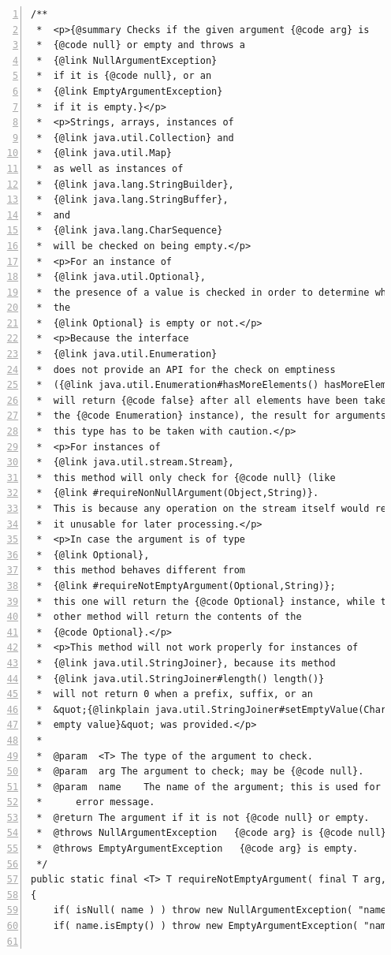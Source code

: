 \documentclass[11pt,a4paper, titlepage, parskip=half, headsepline, footsepline, cleardoublepage=current, headheight=1cm]{scrbook}
\begin{document}
\begin{lstlisting}[numbers=left,caption={requireNotEmptyArgument()},label={listing:requireNotEmptyArgument}]
/**
 *  <p>{@summary Checks if the given argument {@code arg} is 
 *  {@code null} or empty and throws a
 *  {@link NullArgumentException}
 *  if it is {@code null}, or an
 *  {@link EmptyArgumentException}
 *  if it is empty.}</p>
 *  <p>Strings, arrays, instances of
 *  {@link java.util.Collection} and
 *  {@link java.util.Map}
 *  as well as instances of
 *  {@link java.lang.StringBuilder},
 *  {@link java.lang.StringBuffer},
 *  and
 *  {@link java.lang.CharSequence}
 *  will be checked on being empty.</p>
 *  <p>For an instance of
 *  {@link java.util.Optional},
 *  the presence of a value is checked in order to determine whether
 *  the
 *  {@link Optional} is empty or not.</p>
 *  <p>Because the interface
 *  {@link java.util.Enumeration}
 *  does not provide an API for the check on emptiness
 *  ({@link java.util.Enumeration#hasMoreElements() hasMoreElements()}
 *  will return {@code false} after all elements have been taken from
 *  the {@code Enumeration} instance), the result for arguments of
 *  this type has to be taken with caution.</p>
 *  <p>For instances of
 *  {@link java.util.stream.Stream},
 *  this method will only check for {@code null} (like
 *  {@link #requireNonNullArgument(Object,String)}.
 *  This is because any operation on the stream itself would render 
 *  it unusable for later processing.</p>
 *  <p>In case the argument is of type
 *  {@link Optional},
 *  this method behaves different from
 *  {@link #requireNotEmptyArgument(Optional,String)};
 *  this one will return the {@code Optional} instance, while the
 *  other method will return the contents of the 
 *  {@code Optional}.</p>
 *  <p>This method will not work properly for instances of
 *  {@link java.util.StringJoiner}, because its method
 *  {@link java.util.StringJoiner#length() length()}
 *  will not return 0 when a prefix, suffix, or an
 *  &quot;{@linkplain java.util.StringJoiner#setEmptyValue(CharSequence) 
 *  empty value}&quot; was provided.</p>
 *
 *  @param  <T> The type of the argument to check.
 *  @param  arg The argument to check; may be {@code null}.
 *  @param  name    The name of the argument; this is used for the 
 *      error message.
 *  @return The argument if it is not {@code null} or empty.
 *  @throws NullArgumentException   {@code arg} is {@code null}.
 *  @throws EmptyArgumentException   {@code arg} is empty.
 */
public static final <T> T requireNotEmptyArgument( final T arg, final String name )
{
    if( isNull( name ) ) throw new NullArgumentException( "name" );
    if( name.isEmpty() ) throw new EmptyArgumentException( "name" );


\end{lstlisting}
\end{document}
